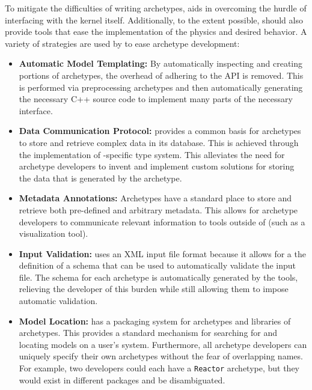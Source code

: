 To mitigate the difficulties of writing archetypes, \Cyclus aids in overcoming
the hurdle of interfacing with the kernel itself. Additionally, to the extent
possible, \Cyclus should also provide tools that ease the implementation of
the physics and desired behavior.  A variety of strategies are used by \Cyclus
to ease archetype development:

\begin{itemize}
\item \textbf{Automatic Model Templating:} By automatically inspecting and
  creating portions of archetypes, the overhead of adhering to the \Cyclus
  \gls{API} is removed. This is performed via preprocessing archetypes and
  then automatically generating the necessary C++ source code to implement
  many parts of the necessary interface.

\item \textbf{Data Communication Protocol:} \Cyclus provides a common basis
  for archetypes to store and retrieve complex data in its database. This is
  achieved through the implementation of \Cyclus-specific type system.  This
  alleviates the need for archetype developers to invent and implement custom
  solutions for storing the data that is generated by the archetype.

\item \textbf{Metadata Annotations:} Archetypes have a standard place to store
  and retrieve both pre-defined and arbitrary metadata.  This allows for
  archetype developers to communicate relevant information to tools outside of
  \Cyclus (such as a visualization tool).

\item \textbf{Input Validation:} \Cyclus uses an \gls{XML} input file format
  because it allows for a the definition of a schema that can be used to
  automatically validate the input file.  The schema for each archetype is
  automatically generated by the \Cyclus tools, relieving the developer of
  this burden while still allowing them to impose automatic validation.

\item \textbf{Model Location:} \Cyclus has a packaging system for archetypes
  and libraries of archetypes. This provides a standard mechanism for
  searching for and locating models on a user's system.  Furthermore, all
  archetype developers can uniquely specify their own archetypes without the
  fear of overlapping names.  For example, two developers could each have a
  \texttt{Reactor} archetype, but they would exist in different packages and
  be disambiguated.

\end{itemize}

